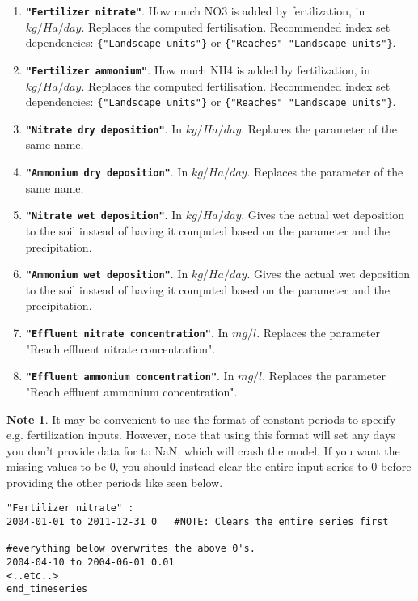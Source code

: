 \documentclass[11pt]{article}
\theoremstyle{definition}
\newtheorem{mynote}{Note}
\newenvironment{note}%
  {\begin{lrbox}{\notebox}%
   \begin{minipage}{\dimexpr\linewidth-2\fboxsep}
   \begin{mynote}}%
  {\end{mynote}%
   \end{minipage}%
   \end{lrbox}%
   \begin{trivlist}
     \item[]\colorbox{silver}{\usebox\notebox}
   \end{trivlist}}
\begin{document}
\begin{enumerate}[i]
\item {\bf\tt "Fertilizer nitrate"}. How much NO3 is added by fertilization, in $kg/Ha/day$. Replaces the computed fertilisation. Recommended index set dependencies: {\tt \{"Landscape units"\}} or {\tt \{"Reaches" "Landscape units"\}}.
\item {\bf\tt "Fertilizer ammonium"}. How much NH4 is added by fertilization, in $kg/Ha/day$. Replaces the computed fertilisation. Recommended index set dependencies: {\tt \{"Landscape units"\}} or {\tt \{"Reaches" "Landscape units"\}}.
\item {\bf\tt "Nitrate dry deposition"}. In $kg/Ha/day$. Replaces the parameter of the same name.
\item {\bf\tt "Ammonium dry deposition"}. In $kg/Ha/day$. Replaces the parameter of the same name.
\item {\bf\tt "Nitrate wet deposition"}. In $kg/Ha/day$. Gives the actual wet deposition to the soil instead of having it computed based on the parameter and the precipitation.
\item {\bf\tt "Ammonium wet deposition"}. In $kg/Ha/day$. Gives the actual wet deposition to the soil instead of having it computed based on the parameter and the precipitation.
\item {\bf\tt "Effluent nitrate concentration"}. In $mg/l$. Replaces the parameter "Reach effluent nitrate concentration".
\item {\bf\tt "Effluent ammonium concentration"}. In $mg/l$. Replaces the parameter "Reach effluent ammonium concentration".
\end{enumerate}

\begin{note}
It may be convenient to use the format of constant periods to specify e.g. fertilization inputs. However, note that using this format will set any days you don't provide data for to NaN, which will crash the model. If you want the missing values to be 0, you should instead clear the entire input series to 0 before providing the other periods like seen below.
\begin{lstlisting}
"Fertilizer nitrate" :
2004-01-01 to 2011-12-31 0   #NOTE: Clears the entire series first

#everything below overwrites the above 0's.
2004-04-10 to 2004-06-01 0.01
<..etc..>
end_timeseries
\end{lstlisting}
\end{note}
\end{document}
